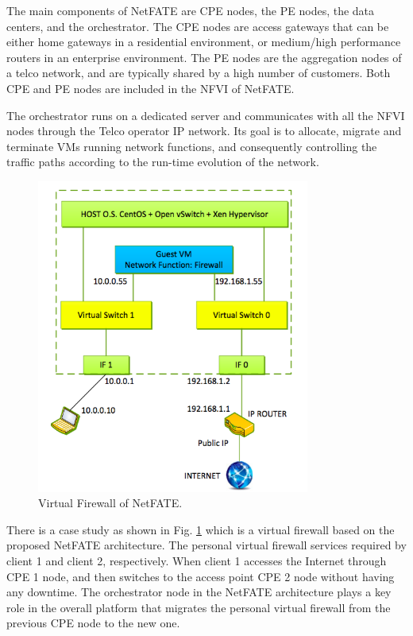 The main components of NetFATE are CPE nodes, the PE nodes, the data centers, and the orchestrator.
The CPE nodes are access gateways that can be either home gateways in a residential environment, or medium/high performance routers in an enterprise environment.
The PE nodes are the aggregation nodes of a telco network, and are typically shared by a high number of customers. Both CPE and PE nodes are included in the NFVI of NetFATE.

The orchestrator runs on a dedicated server and communicates with all the NFVI nodes through the Telco operator IP network. Its goal is to allocate, migrate and terminate VMs running network functions, and consequently controlling the traffic paths according to the run-time evolution of the network.

\begin{figure}[!ht]
\centering
\includegraphics[width=0.8\textwidth]{./fig/netfate.png}
\caption{Virtual Firewall of NetFATE. \cite{netfate}}
\label{fig:netfate}
\end{figure}

There is a case study as shown in Fig. \ref{fig:netfate} which is a virtual firewall based on the proposed NetFATE architecture. The personal virtual firewall services required by client 1 and client 2, respectively. When client 1 accesses the Internet through CPE 1 node, and then switches to the access point CPE 2 node without having any downtime. The orchestrator node in the NetFATE architecture plays a key role in the overall platform that migrates the personal virtual firewall from the previous CPE node to the new one.

